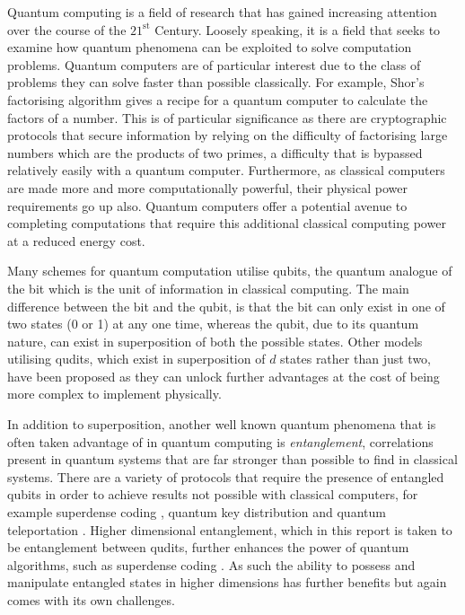 Quantum computing is a field of research that has gained increasing attention over the course of the $21^{\text{st}}$ Century.
Loosely speaking, it is a field that seeks to examine how quantum phenomena can be exploited to solve computation problems.
Quantum computers are of particular interest due to the class of problems they can solve faster than possible classically.
For example, Shor's factorising algorithm \cite{Shor_1997} gives a recipe for a quantum computer to calculate the factors of a number.
This is of particular significance as there are cryptographic protocols that secure information by relying on the difficulty of factorising large numbers which are the products of two primes, a difficulty that is bypassed relatively easily with a quantum computer.
Furthermore, as classical computers are made more and more computationally powerful, their physical power requirements go up also.
Quantum computers offer a potential avenue to completing computations that require this additional classical computing power at a reduced energy cost.

Many schemes for quantum computation utilise qubits, the quantum analogue of the bit which is the unit of information in classical computing.
The main difference between the bit and the qubit, is that the bit can only exist in one of two states (0 or 1) at any one time, whereas the qubit, due to its quantum nature, can exist in superposition of both the possible states.
Other models utilising qudits, which exist in superposition of $d$ states rather than just two, have been proposed as they can unlock further advantages at the cost of being more complex to implement physically.

In addition to superposition, another well known quantum phenomena that is often taken advantage of in quantum computing is \emph{entanglement}, correlations present in quantum systems that are far stronger than possible to find in classical systems.
There are a variety of protocols that require the presence of entangled qubits in order to achieve results not possible with classical computers, for example superdense coding \cite{Superdense}, quantum key distribution \cite{qkd} and quantum teleportation \cite{qteleport}.
Higher dimensional entanglement, which in this report is taken to be entanglement between qudits, further enhances the power of quantum algorithms, such as superdense coding \cite{Liu_2002}.
As such the ability to possess and manipulate entangled states in higher dimensions has further benefits but again comes with its own challenges. 

